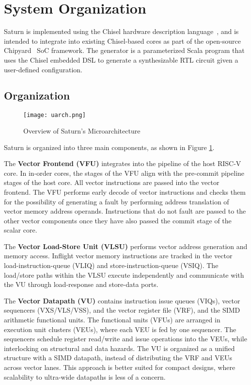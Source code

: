 \newpage
\section{System Organization}
\label{sec:system}

Saturn is implemented using the Chisel hardware description language~\cite{chisel_paper}, and is intended to integrate into existing Chisel-based cores as part of the open-source Chipyard~\cite{chipyard} SoC framework.
The generator is a parameterized Scala program that uses the Chisel embedded DSL to generate a synthesizable RTL circuit given a user-defined configuration.

\subsection{Organization}


\begin{figure}[h]
  \centering
  \texttt{[image: uarch.png]}
  \caption{Overview of Saturn's Microarchitecture}
  \label{fig:overview}
\end{figure}

Saturn is organized into three main components, as shown in Figure \ref{fig:overview}.

The \textbf{Vector Frontend (VFU)} integrates into the pipeline of the host RISC-V core.
In in-order cores, the stages of the VFU align with the pre-commit pipeline stages of the host core.
All vector instructions are passed into the vector frontend.
The VFU performs early decode of vector instructions and checks them for the possibility of generating a fault by performing address translation of vector memory address operands.
Instructions that do not fault are passed to the other vector components once they have also passed the commit stage of the scalar core.

The \textbf{Vector Load-Store Unit (VLSU)} performs vector address generation and memory access.
Inflight vector memory instructions are tracked in the vector load-instruction-queue (VLIQ) and store-instruction-queue (VSIQ).
The load/store paths within the VLSU execute independently and communicate with the VU through load-response and store-data ports.

The \textbf{Vector Datapath (VU)} contains instruction issue queues (VIQs), vector sequencers (VXS/VLS/VSS), and the vector register file (VRF), and the SIMD arithmetic functional units.
The functional units (VFUs) are arranged in execution unit clusters (VEUs), where each VEU is fed by one sequencer.
The sequencers schedule register read/write and issue operations into the VEUs, while interlocking on structural and data hazards.
The VU is organized as a unified structure with a SIMD datapath, instead of distributing the VRF and VEUs across vector lanes.
This approach is better suited for compact designs, where scalability to ultra-wide datapaths is less of a concern.


